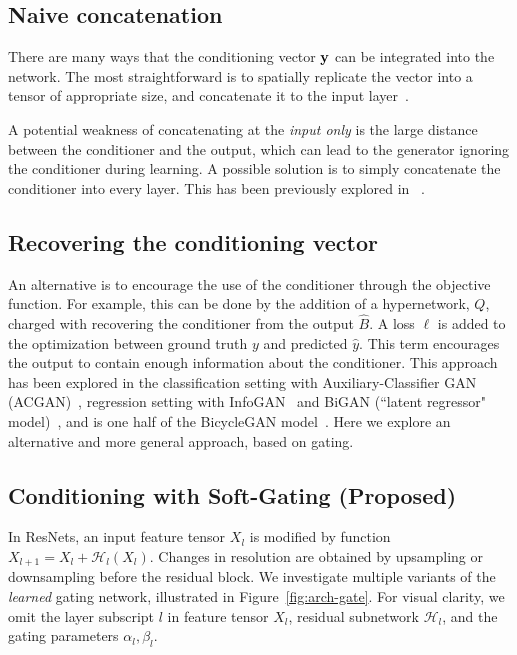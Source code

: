 \subsection{Naive concatenation}
There are many ways that the conditioning vector $\bf y$ can be integrated into the network. 
The most straightforward is to spatially replicate the vector into a tensor of appropriate size, and concatenate it to the input layer~\cite{zhu2017toward,choi2017stargan}.

A potential weakness of concatenating at the {\em input only} is the large distance between the conditioner and the output, which can lead to the generator ignoring the conditioner during learning. A possible solution is to simply concatenate the conditioner into every layer. This has been previously explored in ~\cite{zhu2017toward}.

\subsection{Recovering the conditioning vector}

An alternative is to encourage the use of the conditioner through the objective function. 
For example, this can be done by the addition of a hypernetwork, $Q$, charged with recovering the conditioner from the output $\widehat{B}$. 
A loss $\ell$ is added to the optimization between ground truth $y$ and predicted $\hat{y}$.
This term encourages the output to contain enough information about the conditioner. This approach has been explored in the classification setting with Auxiliary-Classifier GAN (ACGAN)~\cite{odena2016conditional}, regression setting with InfoGAN~\cite{chen2016infogan} and BiGAN (``latent regressor" model)~\cite{dumoulin2016adversarially,donahue2016adversarial}, and is one half of the BicycleGAN model~\cite{zhu2017toward}. Here we explore an alternative and more general approach, based on gating.


\subsection{Conditioning with Soft-Gating (Proposed)}
In ResNets, an input feature tensor $X_l$ is modified by function $X_{l+1} = X_l+\mathcal{H}_l(X_l)$.
Changes in resolution are obtained by upsampling or downsampling before the residual block.
We investigate multiple variants of the \textit{learned} gating network, illustrated in Figure~\ref{fig:arch-gate}.
For visual clarity, we omit the layer subscript $l$ in feature tensor $X_l$, residual subnetwork $\mathcal{H}_l$, and the gating parameters $\alpha_l, \beta_l$.

